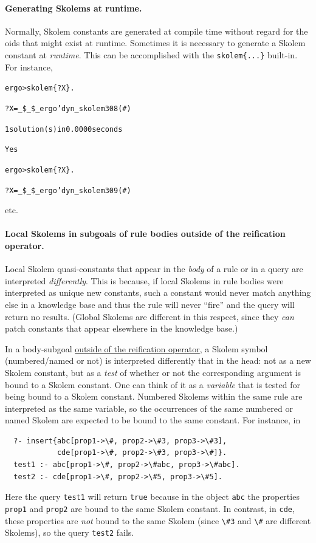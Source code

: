 \documentclass[11pt]{article}
\newcommand{\FLPREFIX}{\_\$\_\$\_ergo}
\newcommand{\prompt}{ergo> }
\newcommand{\bs}{\textbackslash}
\begin{document}
\paragraph{Generating Skolems at runtime.}
Normally,
Skolem constants are generated at compile time without regard for the oids
that might exist at runtime. Sometimes it is necessary to generate a
Skolem constant at \emph{runtime}. This can be accomplished with the
{\tt skolem\{...\}} built-in. For instance, 
\begin{alltt}
\prompt skolem\{?X\}.
 
?X = \FLPREFIX'dyn_skolem308   (\#)
 
1 solution(s) in 0.0000 seconds 
 
Yes

\prompt skolem\{?X\}.

?X = \FLPREFIX'dyn_skolem309  (\#)
\end{alltt}
etc.

\paragraph{Local Skolems in subgoals of rule bodies outside of the reification operator.}
Local Skolem quasi-constants that appear in the \emph{body} of a rule or in
a query are interpreted \emph{differently}. 
This is because, if local Skolems in rule bodies were interpreted as unique
new constants, such a constant would never match anything else in a
knowledge base and thus the rule will never ``fire'' and the query will
return no results. (Global Skolems are different in this respect, since
they \emph{can} patch constants that appear elsewhere in the knowledge
base.) 

In a body-subgoal \underline{outside of the reification operator}, a Skolem
symbol (numbered/named or not) is interpreted differently that in the head: not
as a new  Skolem constant,
but as a \emph{test} of whether or not the
corresponding argument is bound to a Skolem constant. One can think of it
as a \emph{variable} that is tested for being bound to a Skolem constant.
Numbered Skolems within the same rule are interpreted as the same variable,
so the occurrences of the same numbered or named Skolem are expected to be bound to
the same constant. For instance, in
\begin{verbatim}
  ?- insert{abc[prop1->\#, prop2->\#3, prop3->\#3],
            cde[prop1->\#, prop2->\#3, prop3->\#]}.
  test1 :- abc[prop1->\#, prop2->\#abc, prop3->\#abc].
  test2 :- cde[prop1->\#, prop2->\#5, prop3->\#5].
\end{verbatim}
Here the query \texttt{test1} will return \texttt{true} because in the
object \texttt{abc} the properties \texttt{prop1} and \texttt{prop2} are
bound to the same Skolem constant. In contrast, in \texttt{cde}, these
properties are \emph{not} bound to the same Skolem (since \texttt{\bs{}\#3} and
\texttt{\bs{}\#} are different Skolems), so the query \texttt{test2} fails. 
\end{document}
